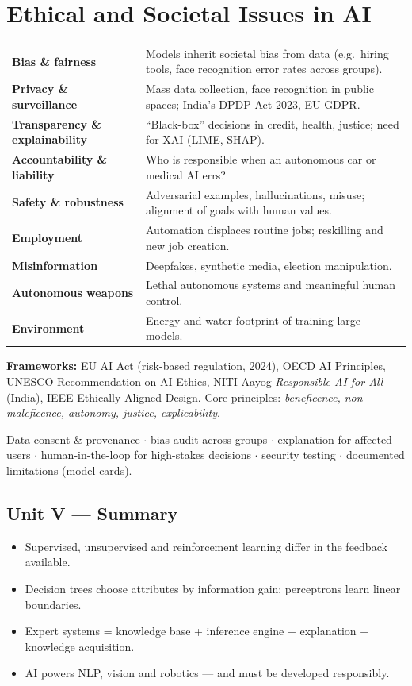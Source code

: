 \section{Ethical and Societal Issues in AI}
\begin{center}\small
\begin{tabularx}{\linewidth}{>{\leavevmode\bfseries\color{navy}}p{3.4cm}X}
\toprule
Bias \& fairness & Models inherit societal bias from data (e.g.\ hiring tools, face recognition error rates across groups).\\
Privacy \& surveillance & Mass data collection, face recognition in public spaces; India's DPDP Act 2023, EU GDPR.\\
Transparency \& explainability & ``Black-box'' decisions in credit, health, justice; need for XAI (LIME, SHAP).\\
Accountability \& liability & Who is responsible when an autonomous car or medical AI errs?\\
Safety \& robustness & Adversarial examples, hallucinations, misuse; alignment of goals with human values.\\
Employment & Automation displaces routine jobs; reskilling and new job creation.\\
Misinformation & Deepfakes, synthetic media, election manipulation.\\
Autonomous weapons & Lethal autonomous systems and meaningful human control.\\
Environment & Energy and water footprint of training large models.\\\bottomrule
\end{tabularx}\end{center}
\textbf{Frameworks:} EU AI Act (risk-based regulation, 2024), OECD AI Principles, UNESCO Recommendation on AI Ethics, NITI Aayog \emph{Responsible AI for All} (India), IEEE Ethically Aligned Design. Core principles: \emph{beneficence, non-maleficence, autonomy, justice, explicability}.
\begin{keypoint}
Data consent \& provenance $\cdot$ bias audit across groups $\cdot$ explanation for affected users $\cdot$ human-in-the-loop for high-stakes decisions $\cdot$ security testing $\cdot$ documented limitations (model cards).
\end{keypoint}

\subsection*{Unit V --- Summary}
\begin{itemize}
\item Supervised, unsupervised and reinforcement learning differ in the feedback available.
\item Decision trees choose attributes by information gain; perceptrons learn linear boundaries.
\item Expert systems = knowledge base + inference engine + explanation + knowledge acquisition.
\item AI powers NLP, vision and robotics --- and must be developed responsibly.
\end{itemize}




